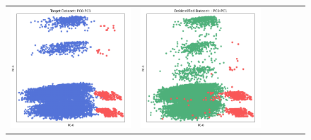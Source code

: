 \begin{figure}[p!]
\begin{tabular}{@{} M{0.166\textwidth} M{0.166\textwidth} | M{0.166\textwidth} M{0.166\textwidth} | M{0.166\textwidth} M{0.166\textwidth} @{}}
       \includegraphics[width=\linewidth]{z_Sarus.orig.png} &
       \includegraphics[width=\linewidth]{z_Sarus.syn.png} &

\end{tabular}
\end{figure}
